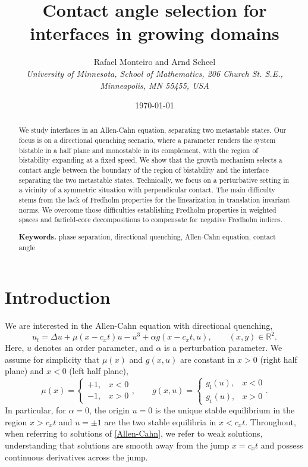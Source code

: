 \documentclass[10pt]{article}
\newcommand{\R}{\mathbb{R}}
\begin{document}
\title{Contact angle selection for interfaces in growing domains}

\author{ Rafael Monteiro  and  Arnd Scheel  \\[2ex]
\textit{\footnotesize University of Minnesota, School of Mathematics,  
206 Church St. S.E., Minneapolis, MN 55455, USA}} 

\date{\small \today} 

\maketitle 
% 
% 
% 
% 
\begin{abstract}
We study interfaces in an Allen-Cahn equation, separating two metastable states. Our focus is on a directional quenching scenario, where a parameter renders the system bistable in a half plane and monostable in its complement, with the region of bistability expanding at a fixed speed. We show that the growth mechanism selects a contact angle between the boundary of the region of bistability and the interface separating the two metastable states. Technically, we focus on a perturbative setting in a vicinity of a symmetric situation with perpendicular contact. The main difficulty stems from the lack of Fredholm properties for the linearization in translation invariant norms. We overcome those difficulties establishing Fredholm properties in weighted spaces and farfield-core decompositions to compensate for negative Fredholm indices. 

\vspace{\baselineskip}


\smallskip
\noindent \textbf{Keywords.} phase separation, directional quenching, Allen-Cahn equation, contact angle\end{abstract}


\section{Introduction}
We are interested in the Allen-Cahn equation with directional quenching,
\begin{equation}\label{Allen-Cahn}
u_t  = \Delta u + \mu(x-c_x t) u  - u^3 + \alpha g(x-c_x t,u) ,\qquad (x,y)\in\R^2.
\end{equation}
Here, $u$ denotes an order parameter, and $\alpha$ is a perturbation parameter. We assume for simplicity that $\mu(x)$ and $g(x,u)$ are constant in $x>0$ (right half plane) and $x<0$ (left half plane),
\[
\mu(x)=\left\{\begin{array}{ll}+1,&x<0\\-1,&x>0\end{array}\right. ,\qquad 
g(x,u)=\left\{\begin{array}{ll}g_\mathrm{l}(u),&x<0\\g_\mathrm{r}(u),&x>0\end{array}\right.
.\]
In particular, for $\alpha=0$, the origin $u=0$ is the unique stable equilibrium in the region $x>c_xt$ and $u=\pm 1$ are the two stable equilibria in $x<c_xt$. Throughout, when referring to solutions of \eqref{Allen-Cahn}, we refer to weak solutions, understanding that solutions are smooth away from the jump $x=c_xt$ and possess continuous derivatives across the jump. 
\end{document}
